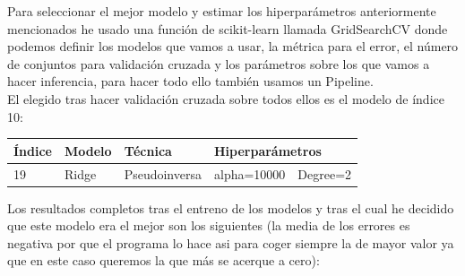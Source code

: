 \documentclass[a4paper,11pt]{article}
\begin{document}
Para seleccionar el mejor modelo y estimar los hiperparámetros anteriormente mencionados he usado una función de scikit-learn llamada GridSearchCV donde podemos definir los modelos que vamos a usar, la métrica para el error, el número de conjuntos para validación cruzada y los parámetros sobre los que vamos a hacer inferencia, para hacer todo ello también usamos un Pipeline.\\

El elegido tras hacer validación cruzada sobre todos ellos es el modelo de índice 10:


\begin{table}[h]
\begin{tabular}{|l|l|l|l|l|l|}
\hline
Índice & Modelo          & Técnica       & \multicolumn{3}{l|}{Hiperparámetros}          \\ \hline
19     & Ridge           & Pseudoinversa & \multicolumn{2}{l|}{alpha=10000}  & Degree=2  \\ \hline
\end{tabular}
\end{table}

Los resultados completos tras el entreno de los modelos y tras el cual he decidido que este modelo era el mejor son los siguientes (la media de los errores es negativa por que el programa lo hace asi para coger siempre la de mayor valor ya que en este caso queremos la que más se acerque a cero):
\end{document}
